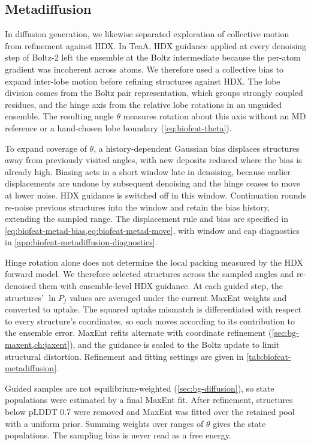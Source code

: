 \subsection{Metadiffusion}
\label{sec:biofeat-metadiffusion}

In diffusion generation, we likewise separated exploration of collective motion from refinement against HDX. In TeaA, HDX guidance applied at every denoising step of Boltz-2 left the ensemble at the Boltz intermediate because the per-atom gradient was incoherent across atoms. %
We therefore used a collective bias to expand inter-lobe motion before refining structures against HDX. The lobe division comes from the Boltz pair representation, which groups strongly coupled residues, and the hinge axis from the relative lobe rotations in an unguided ensemble. The resulting angle $\theta$ measures rotation about this axis without an MD reference or a hand-chosen lobe boundary (\cref{eq:biofeat-theta}).

To expand coverage of $\theta$, a history-dependent Gaussian bias displaces structures away from previously visited angles, with new deposits reduced where the bias is already high.\supercite{barducciWelltemperedMetadynamicsSmoothly2008} Biasing acts in a short window late in denoising, because earlier displacements are undone by subsequent denoising and the hinge ceases to move at lower noise. HDX guidance is switched off in this window. Continuation rounds re-noise previous structures into the window and retain the bias history, extending the sampled range. The displacement rule and bias are specified in \cref{eq:biofeat-metad-bias,eq:biofeat-metad-move}, with window and cap diagnostics in \cref{app:biofeat-metadiffusion-diagnostics}.

Hinge rotation alone does not determine the local packing measured by the HDX forward model. We therefore selected structures across the sampled angles and re-denoised them with ensemble-level HDX guidance. At each guided step, the structures' $\ln P_f$ values are averaged under the current MaxEnt weights and converted to uptake. The squared uptake mismatch is differentiated with respect to every structure's coordinates, so each moves according to its contribution to the ensemble error. MaxEnt refits alternate with coordinate refinement (\cref{sec:bg-maxent,ch:jaxent}), and the guidance is scaled to the Boltz update to limit structural distortion. Refinement and fitting settings are given in \cref{tab:biofeat-metadiffusion}.

Guided samples are not equilibrium-weighted (\cref{sec:bg-diffusion}), so state populations were estimated by a final MaxEnt fit. After refinement, structures below pLDDT 0.7 were removed and MaxEnt was fitted over the retained pool with a uniform prior. Summing weights over ranges of $\theta$ gives the state populations. The sampling bias is never read as a free energy.

